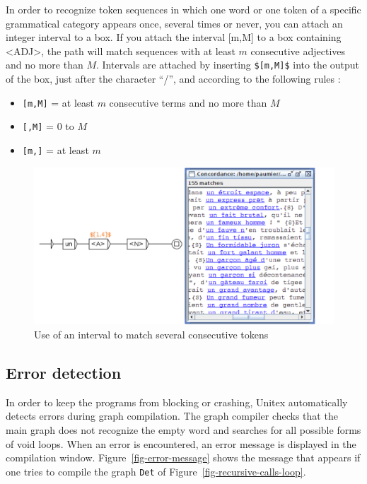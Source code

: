 \bigskip
{}
\noindent In order to recognize token sequences in which one word or one token of a specific grammatical category appears once, several times or never, you can attach an integer interval to a box.
If you attach the interval [m,M] to a box containing <ADJ>, the path will match sequences with at least $m$ consecutive adjectives and no more than $M$.
Intervals are attached by inserting \verb+$[m,M]$+ into the output of the box, just after the character ``/'', and according to the following rules : 
\begin{itemize}
\item \verb+[m,M]+ = at least $m$ consecutive terms and no more than $M$
\item \verb+[,M]+ = 0 to $M$  
\item \verb+[m,]+ = at least $m$
\end{itemize}

\begin{figure}[h!]
\begin{center}
\includegraphics[width=13.5cm]{resources/img/fig6-10a.png}
\caption{Use of an interval to match several consecutive tokens\label{intervals}}
\end{center}
\end{figure}

\subsection{Error detection}
In order to keep the programs from blocking or crashing, Unitex automatically
detects errors during graph compilation. The graph compiler checks that the
main graph does not recognize the empty word and searches for all possible
forms of void loops. When an error is encountered, an error message is
displayed in the compilation window. Figure~\ref{fig-error-message} shows
the message that appears if one tries to compile the graph \verb+Det+ of
Figure~\ref{fig-recursive-calls-loop}.


